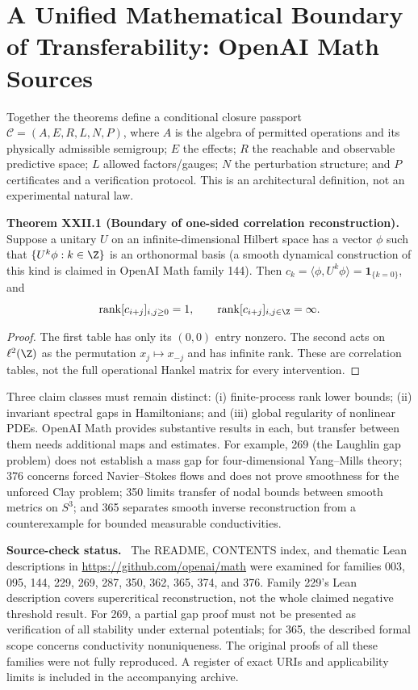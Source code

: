 \documentclass[11pt,a4paper,oneside]{book}
\newcommand{\one}{\mathbf 1}\newcommand{\ii}{\mathrm i}\newcommand{\dd}{\mathrm d}
\DeclareMathOperator{\rank}{rank}\DeclareMathOperator{\Tr}{Tr}
\newcommand{\statement}[3]{\par\medskip\noindent\textbf{#1 #2 (#3).}\ }
\newcommand{\note}[1]{\par\medskip\noindent\textbf{#1}\ }
\begin{document}
\chapter{A Unified Mathematical Boundary of Transferability: OpenAI Math Sources}
Together the theorems define a conditional closure passport $\mathcal C=(A,E,R,L,N,P)$, where $A$ is the algebra of permitted operations and its physically admissible semigroup; $E$ the effects; $R$ the reachable and observable predictive space; $L$ allowed factors/gauges; $N$ the perturbation structure; and $P$ certificates and a verification protocol. This is an architectural definition, not an experimental natural law.
\statement{Theorem}{XXII.1}{Boundary of one-sided correlation reconstruction} Suppose a unitary $U$ on an infinite-dimensional Hilbert space has a vector $\phi$ such that $\{U^k\phi:k\in\Z\}$ is an orthonormal basis (a smooth dynamical construction of this kind is claimed in OpenAI Math family 144). Then $c_k=\langle\phi,U^k\phi\rangle=\one_{\{k=0\}}$, and
\[\rank[c_{i+j}]_{i,j\ge0}=1,\qquad\rank[c_{i+j}]_{i,j\in\Z}=\infty.\]
\begin{proof}The first table has only its $(0,0)$ entry nonzero. The second acts on $\ell^2(\Z)$ as the permutation $x_j\mapsto x_{-j}$ and has infinite rank. These are correlation tables, not the full operational Hankel matrix for every intervention.\end{proof}
Three claim classes must remain distinct: (i) finite-process rank lower bounds; (ii) invariant spectral gaps in Hamiltonians; and (iii) global regularity of nonlinear PDEs. OpenAI Math provides substantive results in each, but transfer between them needs additional maps and estimates. For example, 269 (the Laughlin gap problem) does not establish a mass gap for four-dimensional Yang--Mills theory; 376 concerns forced Navier--Stokes flows and does not prove smoothness for the unforced Clay problem; 350 limits transfer of nodal bounds between smooth metrics on $S^3$; and 365 separates smooth inverse reconstruction from a counterexample for bounded measurable conductivities.
\note{Source-check status.} The README, CONTENTS index, and thematic Lean descriptions in \url{https://github.com/openai/math} were examined for families 003, 095, 144, 229, 269, 287, 350, 362, 365, 374, and 376. Family 229's Lean description covers supercritical reconstruction, not the whole claimed negative threshold result. For 269, a partial gap proof must not be presented as verification of all stability under external potentials; for 365, the described formal scope concerns conductivity nonuniqueness. The original proofs of all these families were not fully reproduced. A register of exact URIs and applicability limits is included in the accompanying archive.
\end{document}
